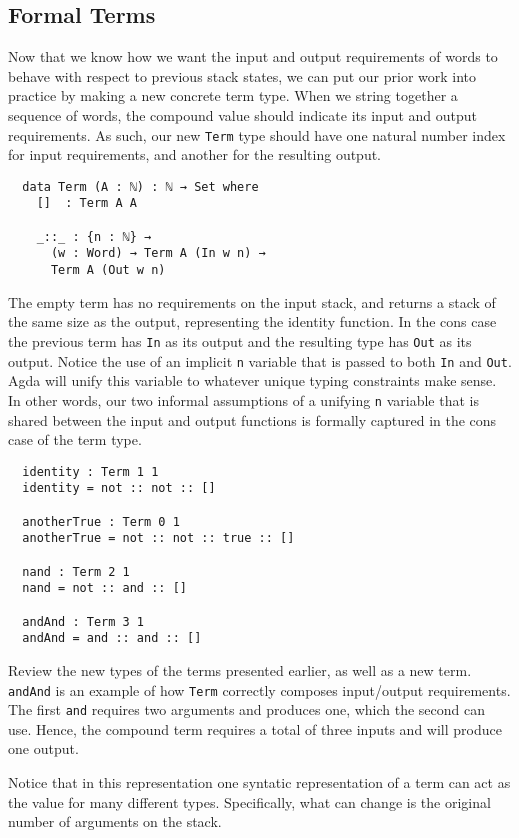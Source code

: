 \documentclass{acm_proc_article-sp}
\begin{document}
\subsection{Formal Terms}

Now that we know how we want the input and output requirements of
words to behave with respect to previous stack states, we can put our
prior work into practice by making a new concrete term type. When we
string together a sequence of words, the compound value should
indicate its input and output requirements. As such, our new
\texttt{Term} type should have one natural number index for input
requirements, and another for the resulting output.

\begin{verbatim}
  data Term (A : ℕ) : ℕ → Set where
    []  : Term A A

    _::_ : {n : ℕ} →
      (w : Word) → Term A (In w n) →
      Term A (Out w n)
\end{verbatim}

The empty term has no requirements on the input stack, and returns a
stack of the same size as the output, representing the identity
function. In the cons case the previous term has \texttt{In} as its
output and the resulting type has \texttt{Out} as its output. Notice
the use of an implicit \texttt{n} variable that is passed to both
\texttt{In} and \texttt{Out}. Agda will unify this variable to
whatever unique typing constraints make sense. In other words, our two
informal assumptions of a unifying \texttt{n} variable that is shared
between the input and output functions is formally captured in the
cons case of the term type.

\begin{verbatim}
  identity : Term 1 1
  identity = not :: not :: []

  anotherTrue : Term 0 1
  anotherTrue = not :: not :: true :: []

  nand : Term 2 1
  nand = not :: and :: []

  andAnd : Term 3 1
  andAnd = and :: and :: []
\end{verbatim}

Review the new types of the terms presented earlier, as well as a new
term. \texttt{andAnd} is an example of how \texttt{Term} correctly
composes input/output requirements. The first \texttt{and} requires
two arguments and produces one, which the second can use. Hence, the
compound term requires a total of three inputs and will produce one
output.

Notice that in this representation one syntatic representation of a
term can act as the value for many different types. Specifically, what
can change is the original number of arguments on the stack.
\end{document}
